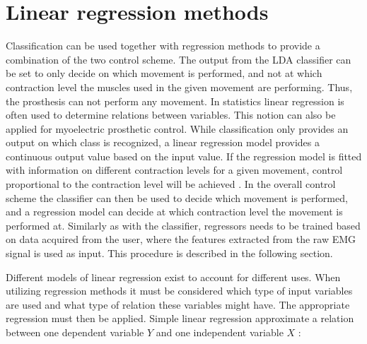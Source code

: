 \section{Linear regression methods}
Classification can be used together with regression methods to provide a combination of the two control scheme. The output from the LDA classifier can be set to only decide on which movement is performed, and not
at which contraction level the muscles used in the given movement are performing. Thus, the prosthesis can not perform any movement.  In statistics linear regression is often used to determine relations between variables. This notion can also be applied for myoelectric prosthetic control. While classification only provides an output on which class is recognized, a linear regression model provides a continuous output value based on the input value. If the regression model is fitted with information on different contraction levels for a given movement, control proportional to the contraction level will be achieved \cite{Hwang2017, Hahne2014, Bruun2017}. In the overall control scheme the classifier can then be used to decide which movement is performed, and a regression model can decide at which contraction level the movement is performed at. Similarly as with the classifier, regressors needs to be trained based on data acquired from the user, where the features extracted from the raw EMG signal is used as input. This procedure is described in the following section. 

Different models of linear regression exist to account for different uses. When utilizing regression methods it must be considered which type of input variables are used and what type of relation these variables might have. The appropriate regression must then be applied. Simple linear regression approximate a relation between one dependent variable $Y$ and one independent variable $X$ \cite{Zar2009}:

